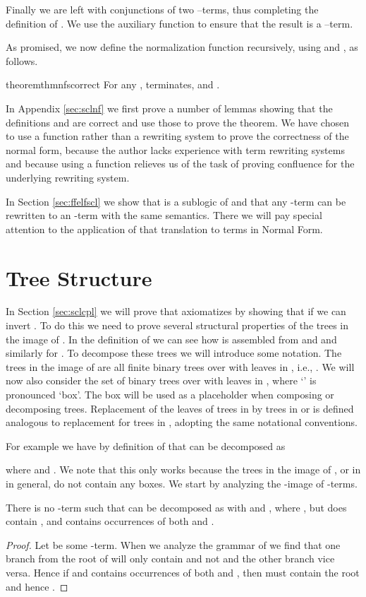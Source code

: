 Finally we are left with conjunctions of two --terms, thus completing
the definition of .  We use the auxiliary function  to ensure that the result is a
--term.


As promised, we now define the normalization function 
recursively, using  and , as follows.


\begin{restatable}{theorem}{thmnfscorrect}
\label{thm:nfs}
For any ,  terminates,  and .
\end{restatable}

In Appendix \ref{sec:sclnf} we first prove a number of lemmas showing that the
definitions  and  are correct and use those to prove the
theorem. We have chosen to use a function rather than a rewriting system to
prove the correctness of the normal form, because the author lacks experience
with term rewriting systems and because using a function relieves us of the
task of proving confluence for the underlying rewriting system.

In Section \ref{sec:ffelfscl} we show that  is a sublogic of  and
that any -term can be rewritten to an -term with the same
semantics. There we will pay special attention to the application of that
translation to terms in  Normal Form.

\section{Tree Structure}
In Section \ref{sec:sclcpl} we will prove that  axiomatizes 
by showing that if  we can invert . To do this we need to
prove several structural properties of the trees in the image of . In the
definition of  we can see how  is assembled from
 and  and similarly for . To decompose these
trees we will introduce some notation. The trees in the image of  are all
finite binary trees over  with leaves in , i.e.,
. We will now also consider the set  of binary
trees over  with leaves in , where `' is
pronounced `box'. The box will be used as a placeholder when composing or
decomposing trees. Replacement of the leaves of trees in  by trees in
 or  is defined analogous to replacement for trees in , adopting
the same notational conventions.

For example we have by definition of  that  can be
decomposed as

where  and . We note that
this only works because the trees in the image of , or in  in general,
do not contain any boxes. We start by analyzing the -image of
-terms.

\begin{lemma}
\label{lem:slitstf}
There is no -term  such that  can be decomposed as
 with  and , where , but
does contain , and  contains occurrences of both  and
.
\end{lemma}
\begin{proof}
Let  be some -term. When we analyze the grammar of  we find that
one branch from the root of  will only contain  and not 
and the other branch vice versa. Hence if  and 
contains occurrences of both  and , then  must contain the
root and hence .
\end{proof}

